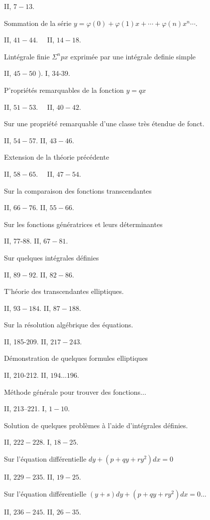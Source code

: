 \documentclass{article}
\begin{document}
II, \(7-13\).

Sommation de la série \(y=\varphi(0)+\varphi(1) x+\cdots+\varphi(n) x^{n} \cdots\).

II, \(41-44 . \quad\) II, \(14-18\).

Lintégrale finie \(\Sigma^{n} p x\) exprimée par une intégrale definie simple

II, \(45-50\) ). I, 34-39.

P'ropriétés remarquables de la fonction \(y=q x\)

II, \(51-53 . \quad\) II, \(40-42\).

Sur une propriété remarquable d'une classe très étendue de fonct.

II, \(54-57\). II, \(43-46\).

Extension de la théorie précédente

II, \(58-65 . \quad\) II, \(47-54\).

Sur la comparaison des fonctions transcendantes

II, \(66-76\). II, \(55-66\).

Sur les fonctions génératrices et leurs déterminantes

II, 77-88. II, \(67-81\).

Sur quelques intégrales définies

II, \(89-92\). II, \(82-86\).

T'héorie des transcendantes elliptiques.

II, \(93-184\). II, \(87-188\).

Sur la résolution algébrique des équations.

II, 185-209. II, \(217-243\).

Démonstration de quelques formules elliptiques

II, 210-212. II, \(194 \ldots 196\).

Méthode générale pour trouver des fonctions...

II, 213--221. I, \(1-10\).

Solution de quelques problèmes à l'aide d'intégrales définies.

II, \(222-228\). I, \(18-25\).

Sur l'équation différentielle \(d y+\left(p+q y+r y^{2}\right) d x=0\)

II, \(229-235\). II, \(19-25\).

Sur l'équation différentielle \((y+s) d y+\left(p+q y+r y^{2}\right) d x=0 \ldots\)

II, \(236-245\). II, \(26-35\).
\end{document}
